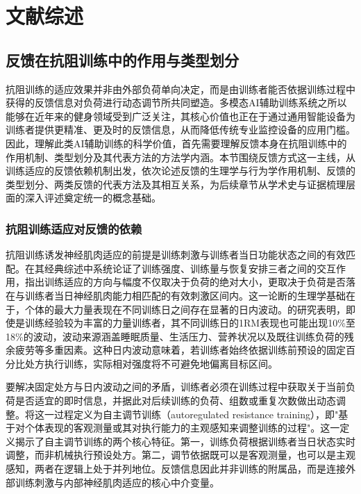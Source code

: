 
\chapter{文献综述}

\section{反馈在抗阻训练中的作用与类型划分}

抗阻训练的适应效果并非由外部负荷单向决定，而是由训练者能否依据训练过程中获得的反馈信息对负荷进行动态调节所共同塑造。多模态AI辅助训练系统之所以能够在近年来的健身领域受到广泛关注，其核心价值也正在于通过通用智能设备为训练者提供更精准、更及时的反馈信息，从而降低传统专业监控设备的应用门槛。因此，理解此类AI辅助训练的科学价值，首先需要理解反馈本身在抗阻训练中的作用机制、类型划分及其代表方法的方法学内涵。本节围绕反馈方式这一主线，从训练适应的反馈依赖机制出发，依次论述反馈的生理学与行为学作用机制、反馈的类型划分、两类反馈的代表方法及其相互关系，为后续章节从学术史与证据梳理层面的深入评述奠定统一的概念基础。

\subsection{抗阻训练适应对反馈的依赖}

抗阻训练诱发神经肌肉适应的前提是训练刺激与训练者当日功能状态之间的有效匹配。\citep{Kraemer2004}在其经典综述中系统论证了训练强度、训练量与恢复安排三者之间的交互作用，指出训练适应的方向与幅度不仅取决于负荷的绝对大小，更取决于负荷是否落在与训练者当日神经肌肉能力相匹配的有效刺激区间内。这一论断的生理学基础在于，个体的最大力量表现在不同训练日之间存在显著的日内波动。\citep{Zourdos2016}的研究表明，即使是训练经验较为丰富的力量训练者，其不同训练日的1RM表现也可能出现10\%至18\%的波动，波动来源涵盖睡眠质量、生活压力、营养状况以及既往训练负荷的残余疲劳等多重因素。这种日内波动意味着，若训练者始终依据训练前预设的固定百分比处方执行训练，实际相对强度将不可避免地偏离目标区间。

要解决固定处方与日内波动之间的矛盾，训练者必须在训练过程中获取关于当前负荷是否适宜的即时信息，并据此对后续训练的负荷、组数或重复次数做出动态调整。\citep{Greig2020}将这一过程定义为自主调节训练（autoregulated resistance training），即"基于对个体表现的客观测量或其对执行能力的主观感知来调整训练的过程"。这一定义揭示了自主调节训练的两个核心特征。第一，训练负荷根据训练者当日状态实时调整，而非机械执行预设处方。第二，调节依据既可以是客观测量，也可以是主观感知，两者在逻辑上处于并列地位。反馈信息因此并非训练的附属品，而是连接外部训练刺激与内部神经肌肉适应的核心中介变量。

